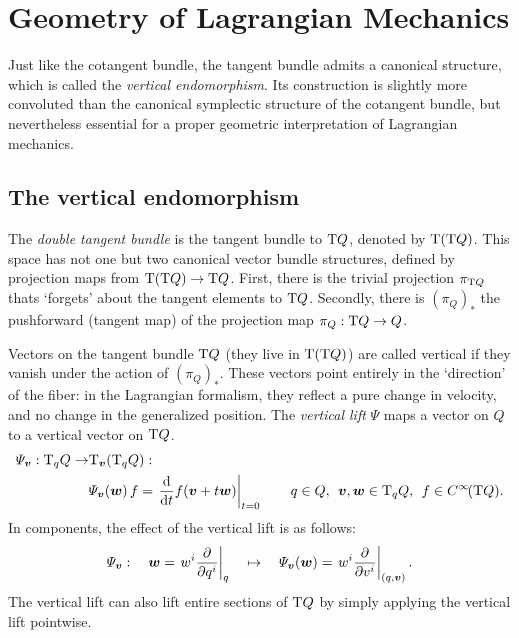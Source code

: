 \chapter{Geometry of Lagrangian Mechanics}
\label{app:symplectic_geometry}

Just like the cotangent bundle, the tangent bundle admits a canonical structure, which is called the \emph{vertical endomorphism}. Its construction is slightly more convoluted than the canonical symplectic structure of the cotangent bundle, but nevertheless essential for a proper geometric interpretation of Lagrangian mechanics. 

\section{The vertical endomorphism} The \emph{double tangent bundle} is the tangent bundle to $\mathrm{T}Q$, denoted by $\mathrm{T}(\mathrm{T}Q)$. This space has not one but two canonical vector bundle structures, defined by projection maps from $\mathrm{T}(\mathrm{T}Q) \to \mathrm{T}Q$. First, there is the trivial projection $\pi_{\mathrm{T}Q}$ thats `forgets' about the tangent elements to $\mathrm{T}Q$. Secondly, there is $ (\pi_{Q})_* $ the pushforward (tangent map) of the projection map $\pi_Q: \mathrm{T}Q \to Q$. \cite{Abraham1978}
\begin{center}
\end{center}
Vectors on the tangent bundle $\mathrm{T}Q$ (they live in $\mathrm{T}(\mathrm{T}Q)$) are called vertical if they vanish under the action of $ (\pi_Q)_* $. These vectors point entirely in the `direction' of the fiber: in the Lagrangian formalism, they reflect a pure change in velocity, and no change in the generalized position. The \emph{vertical lift} $\Psi$ maps a vector on $Q$ to a vertical vector on $\mathrm{T}Q$. \cite{Carinena1990}
\begin{equation}
    \begin{split}
        \Psi_{\vec{v}}: \tspace{q}{Q} \to & \tspace{\vec{v}}{\qty(\tspace{q}{Q})}: \\ 
        & \Psi_{\vec{v}}(\vec{w})\,f = \left. \dv{}{t} f(\vec{v} + t\vec{w})\right |_{t = 0}
        \qquad q \in Q,\:\: \vec{v},\vec{w}\in \tspace{q}{Q},\:\: f \in \functions{\tbundle{Q}}.
    \end{split}
\end{equation}
In components, the effect of the vertical lift is as follows:
$$\Psi_{\vec{v}}: \quad \vec{w} = \left. w^i \pdv{}{q^i}\right|_q \quad \mapsto \quad  \Psi_{\vec{v}}(\vec{w}) = \left.w^i \pdv{}{v^i}\right|_{(q, \vec{v})}. $$
The vertical lift can also lift entire sections of $\mathrm{T}Q$ by simply applying the vertical lift pointwise.

